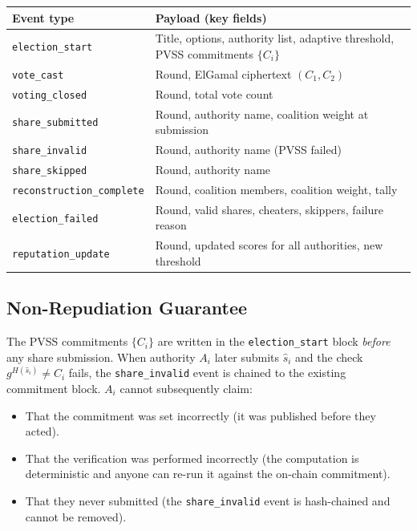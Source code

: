 \documentclass[12pt,a4paper]{article}
\theoremstyle{definition}
\theoremstyle{remark}
\begin{document}
\begin{center}
\begin{tabular}{lp{8.5cm}}
\toprule
\textbf{Event type} & \textbf{Payload (key fields)} \\
\midrule
\texttt{election\_start}          & Title, options, authority list, adaptive threshold, PVSS commitments $\{C_i\}$ \\
\texttt{vote\_cast}               & Round, ElGamal ciphertext $(C_1, C_2)$ \\
\texttt{voting\_closed}           & Round, total vote count \\
\texttt{share\_submitted}         & Round, authority name, coalition weight at submission \\
\texttt{share\_invalid}           & Round, authority name (PVSS failed) \\
\texttt{share\_skipped}           & Round, authority name \\
\texttt{reconstruction\_complete} & Round, coalition members, coalition weight, tally \\
\texttt{election\_failed}         & Round, valid shares, cheaters, skippers, failure reason \\
\texttt{reputation\_update}       & Round, updated scores for all authorities, new threshold \\
\bottomrule
\end{tabular}
\end{center}

\subsection{Non-Repudiation Guarantee}

The PVSS commitments $\{C_i\}$ are written in the
\texttt{election\_start} block \emph{before} any share submission.
When authority $A_i$ later submits $\hat{s}_i$ and the check
$g^{H(\hat{s}_i)} \neq C_i$ fails, the \texttt{share\_invalid} event is
chained to the existing commitment block.
$A_i$ cannot subsequently claim:
\begin{itemize}
  \item That the commitment was set incorrectly (it was published before they acted).
  \item That the verification was performed incorrectly (the computation is
    deterministic and anyone can re-run it against the on-chain commitment).
  \item That they never submitted (the \texttt{share\_invalid} event is
    hash-chained and cannot be removed).
\end{itemize}
\end{document}
